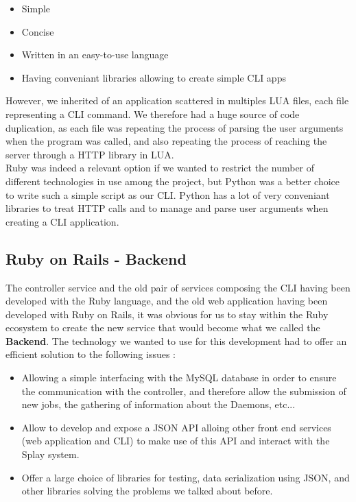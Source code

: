 \documentclass{eplmastersthesis}
\begin{document}
        \begin{itemize}
          \item Simple
          \item Concise
          \item Written in an easy-to-use language
          \item Having conveniant libraries allowing to create simple CLI apps
        \end{itemize}

        However, we inherited of an application scattered in multiples LUA
        files, each file representing a CLI command. We therefore had a huge
        source of code duplication, as each file was repeating the process
        of parsing the user arguments when the program was called, and also
        repeating the process of reaching the server through a HTTP library
        in LUA.\\
        Ruby was indeed a relevant option if we wanted to restrict the number
        of different technologies in use among the project, but Python was
        a better choice to write such a simple script as our CLI. Python has
        a lot of very conveniant libraries to treat HTTP calls and to
        manage and parse user arguments when creating a CLI application.

      \subsection{Ruby on Rails - Backend}

        The controller service and the old pair of services composing the CLI
        having been developed with the Ruby language, and the old web
        application having been developed with Ruby on Rails, it was obvious
        for us to stay within the Ruby ecosystem to create the new service
        that would become what we called the \textbf{Backend}. The technology
        we wanted to use for this development had to offer an efficient
        solution to the following issues :

        \begin{itemize}
          \item Allowing a simple interfacing with the MySQL database in order
          to ensure the communication with the controller, and therefore allow
          the submission of new jobs, the gathering of information about the
          Daemons, etc...
          \item Allow to develop and expose a JSON API alloing other front
          end services (web application and CLI) to make use of this API and
          interact with the Splay system.
          \item Offer a large choice of libraries for testing, data
          serialization using JSON, and other libraries solving the problems
          we talked about before.
        \end{itemize}
\end{document}
